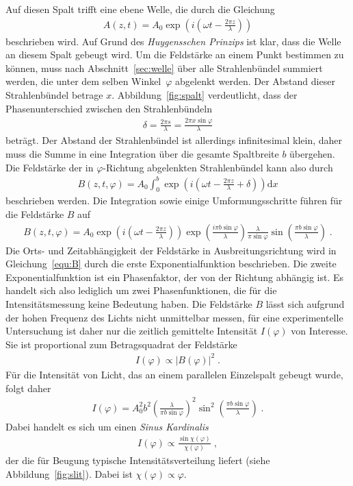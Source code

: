 Auf diesen Spalt trifft eine ebene Welle, die durch die Gleichung
\begin{align}
  A(z,t) = A_0 \exp{(i(\omega t - \frac{2 \pi z}{\lambda}))}
  \label{equ:ebeneWelle}
\end{align}
beschrieben wird. Auf Grund des \emph{Huygensschen Prinzips} ist klar, dass die Welle an diesem Spalt gebeugt wird. Um die Feldstärke an einem Punkt bestimmen zu können, muss nach Abschnitt~\ref{sec:welle} über alle Strahlenbündel summiert werden, die unter dem selben Winkel~$\varphi$ abgelenkt werden. Der Abstand dieser Strahlenbündel betrage $x$. Abbildung~\ref{fig:spalt} verdeutlicht, dass der Phasenunterschied zwischen den Strahlenbündeln
\begin{align}
  \delta = \frac{2 \pi s}{\lambda} = \frac{2 \pi x \sin{\varphi}}{\lambda}
  \label{equ:delta}
\end{align}
beträgt. Der Abstand der Strahlenbündel ist allerdings infinitesimal klein, daher muss die Summe in eine Integration über die gesamte Spaltbreite $b$ übergehen. Die Feldstärke der in $\varphi$-Richtung abgelenkten Strahlenbündel kann also durch
\begin{align}
  B(z,t,\varphi) = A_0 \int_0^b \exp{(i(\omega t - \frac{2 \pi z}{\lambda} + \delta))} \mathrm dx
\end{align}
beschrieben werden.
Die Integration sowie einige Umformungsschritte führen für die Feldstärke $B$ auf
\begin{align}
  B(z,t,\varphi) = A_0 \exp{(i(\omega t - \frac{2 \pi z}{\lambda}))} \exp{( \frac{i \pi b \sin{\varphi}}{\lambda})} \frac{\lambda}{\pi \sin{\varphi}} \sin{(\frac{\pi b \sin{\varphi}}{\lambda})} \; .
  \label{equ:B}
\end{align}
Die Orts- und Zeitabhängigkeit der Feldstärke in Ausbreitungsrichtung wird in Gleichung~\eqref{equ:B} durch die erste Exponentialfunktion beschrieben. Die zweite Exponentialfunktion ist ein Phasenfaktor, der von der Richtung abhängig ist. Es handelt sich also lediglich um zwei Phasenfunktionen, die für die Intensitätsmessung keine Bedeutung haben. Die Feldstärke $B$ lässt sich aufgrund der hohen Frequenz des Lichts nicht unmittelbar messen, für eine experimentelle Untersuchung ist daher nur die zeitlich gemittelte Intensität $I(\varphi)$ von Interesse. Sie ist proportional zum Betragsquadrat der Feldstärke
\begin{align}
  I(\varphi) \propto  |B(\varphi)|^2 \; .
\end{align}
Für die Intensität von Licht, das an einem parallelen Einzelspalt gebeugt wurde, folgt daher
\begin{align}
  I(\varphi) = A_0^2 b^2 (\frac{\lambda}{\pi b \sin{\varphi}})^2 \sin^2{(\frac{\pi b \sin{\varphi}}{\lambda})} \; .
  \label{equ:I}
\end{align}
Dabei handelt es sich um einen \emph{Sinus Kardinalis}
\begin{align}
  I(\varphi) \propto \frac{\sin{\chi(\varphi)}}{\chi(\varphi)} \; ,
\end{align}
der die für Beugung typische Intensitätsverteilung liefert (siehe Abbildung~\ref{fig:slit}). Dabei ist $\chi(\varphi) \propto \varphi$.


